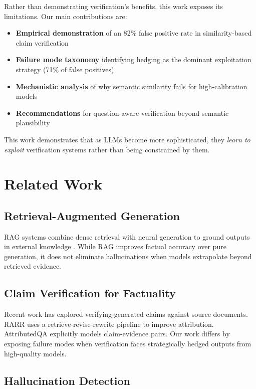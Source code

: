 \documentclass[11pt]{article}
\begin{document}
Rather than demonstrating verification's benefits, this work exposes its limitations. Our main contributions are:

\begin{itemize}
\item \textbf{Empirical demonstration} of an 82\% false positive rate in similarity-based claim verification
\item \textbf{Failure mode taxonomy} identifying hedging as the dominant exploitation strategy (71\% of false positives)
\item \textbf{Mechanistic analysis} of why semantic similarity fails for high-calibration models
\item \textbf{Recommendations} for question-aware verification beyond semantic plausibility
\end{itemize}

This work demonstrates that as LLMs become more sophisticated, they \textit{learn to exploit} verification systems rather than being constrained by them.

\section{Related Work}

\subsection{Retrieval-Augmented Generation}

RAG systems combine dense retrieval with neural generation to ground outputs in external knowledge \cite{lewis2020retrieval, izacard2021leveraging}. While RAG improves factual accuracy over pure generation, it does not eliminate hallucinations when models extrapolate beyond retrieved evidence.

\subsection{Claim Verification for Factuality}

Recent work has explored verifying generated claims against source documents. RARR \cite{gao2023rarr} uses a retrieve-revise-rewrite pipeline to improve attribution. AttributedQA \cite{bohnet2022attributed} explicitly models claim-evidence pairs. Our work differs by exposing failure modes when verification faces strategically hedged outputs from high-quality models.

\subsection{Hallucination Detection}
\end{document}
